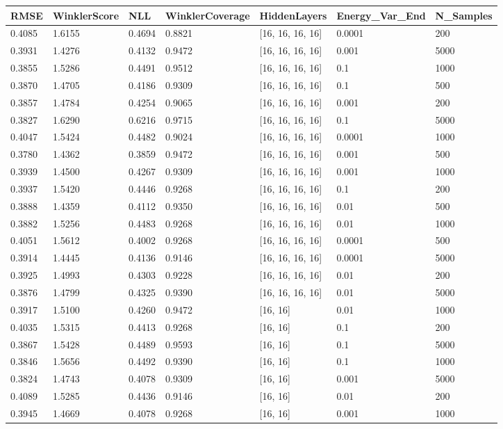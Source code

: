 \begin{tabular}{lllllll}
\toprule
RMSE & WinklerScore & NLL & WinklerCoverage & HiddenLayers & Energy_Var_End & N_Samples \\
\midrule
0.4085 & 1.6155 & 0.4694 & 0.8821 & [16, 16, 16, 16] & 0.0001 & 200 \\
0.3931 & 1.4276 & 0.4132 & 0.9472 & [16, 16, 16, 16] & 0.001 & 5000 \\
0.3855 & 1.5286 & 0.4491 & 0.9512 & [16, 16, 16, 16] & 0.1 & 1000 \\
0.3870 & 1.4705 & 0.4186 & 0.9309 & [16, 16, 16, 16] & 0.1 & 500 \\
0.3857 & 1.4784 & 0.4254 & 0.9065 & [16, 16, 16, 16] & 0.001 & 200 \\
0.3827 & 1.6290 & 0.6216 & 0.9715 & [16, 16, 16, 16] & 0.1 & 5000 \\
0.4047 & 1.5424 & 0.4482 & 0.9024 & [16, 16, 16, 16] & 0.0001 & 1000 \\
0.3780 & 1.4362 & 0.3859 & 0.9472 & [16, 16, 16, 16] & 0.001 & 500 \\
0.3939 & 1.4500 & 0.4267 & 0.9309 & [16, 16, 16, 16] & 0.001 & 1000 \\
0.3937 & 1.5420 & 0.4446 & 0.9268 & [16, 16, 16, 16] & 0.1 & 200 \\
0.3888 & 1.4359 & 0.4112 & 0.9350 & [16, 16, 16, 16] & 0.01 & 500 \\
0.3882 & 1.5256 & 0.4483 & 0.9268 & [16, 16, 16, 16] & 0.01 & 1000 \\
0.4051 & 1.5612 & 0.4002 & 0.9268 & [16, 16, 16, 16] & 0.0001 & 500 \\
0.3914 & 1.4445 & 0.4136 & 0.9146 & [16, 16, 16, 16] & 0.0001 & 5000 \\
0.3925 & 1.4993 & 0.4303 & 0.9228 & [16, 16, 16, 16] & 0.01 & 200 \\
0.3876 & 1.4799 & 0.4325 & 0.9390 & [16, 16, 16, 16] & 0.01 & 5000 \\
0.3917 & 1.5100 & 0.4260 & 0.9472 & [16, 16] & 0.01 & 1000 \\
0.4035 & 1.5315 & 0.4413 & 0.9268 & [16, 16] & 0.1 & 200 \\
0.3867 & 1.5428 & 0.4489 & 0.9593 & [16, 16] & 0.1 & 5000 \\
0.3846 & 1.5656 & 0.4492 & 0.9390 & [16, 16] & 0.1 & 1000 \\
0.3824 & 1.4743 & 0.4078 & 0.9309 & [16, 16] & 0.001 & 5000 \\
0.4089 & 1.5285 & 0.4436 & 0.9146 & [16, 16] & 0.01 & 200 \\
0.3945 & 1.4669 & 0.4078 & 0.9268 & [16, 16] & 0.001 & 1000 \\

\end{tabular}
